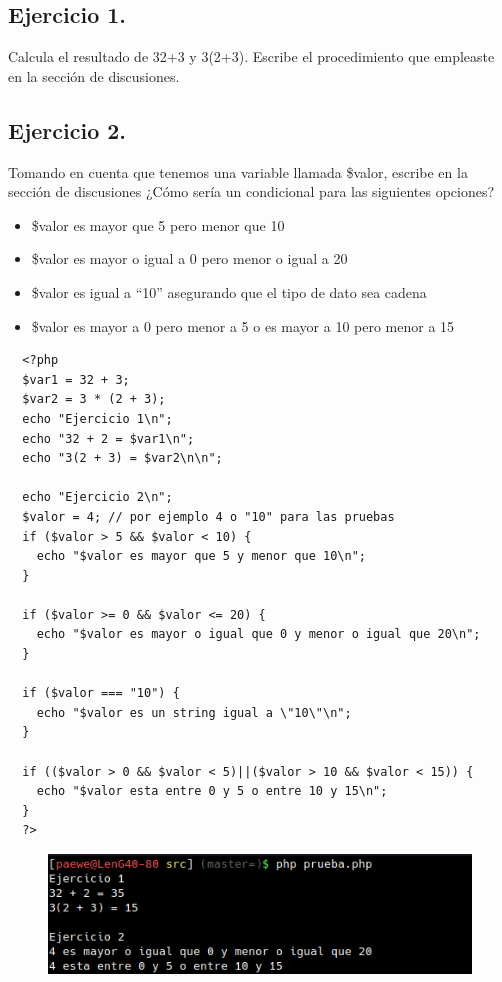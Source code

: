 \documentclass{article}
\begin{document}
\subsection*{Ejercicio 1.}%
Calcula el resultado de 32+3 y 3(2+3). Escribe el procedimiento que empleaste
en la sección de discusiones.\\

\subsection*{Ejercicio 2.}%
Tomando en cuenta que tenemos una variable llamada \$valor, escribe en la
sección de discusiones ¿Cómo sería un condicional para las siguientes opciones?\\

\begin{itemize}
  \item \$valor es mayor que 5 pero menor que 10
  \item \$valor es mayor o igual a 0 pero menor o igual a 20
  \item \$valor es igual a “10” asegurando que el tipo de dato sea cadena
  \item \$valor es mayor a 0 pero menor a 5 o es mayor a 10 pero menor a 15
\end{itemize}


\begin{verbatim}
  <?php
  $var1 = 32 + 3;
  $var2 = 3 * (2 + 3);
  echo "Ejercicio 1\n";
  echo "32 + 2 = $var1\n";
  echo "3(2 + 3) = $var2\n\n";

  echo "Ejercicio 2\n";
  $valor = 4; // por ejemplo 4 o "10" para las pruebas
  if ($valor > 5 && $valor < 10) {
    echo "$valor es mayor que 5 y menor que 10\n";
  }

  if ($valor >= 0 && $valor <= 20) {
    echo "$valor es mayor o igual que 0 y menor o igual que 20\n";
  }

  if ($valor === "10") {
    echo "$valor es un string igual a \"10\"\n";
  }

  if (($valor > 0 && $valor < 5)||($valor > 10 && $valor < 15)) {
    echo "$valor esta entre 0 y 5 o entre 10 y 15\n";
  }
  ?>
\end{verbatim}

\begin{figure}[h!]
  \centering
  \includegraphics[scale=0.75]{./Pictures/034_operadores_exer.png}
\end{figure}
\end{document}
